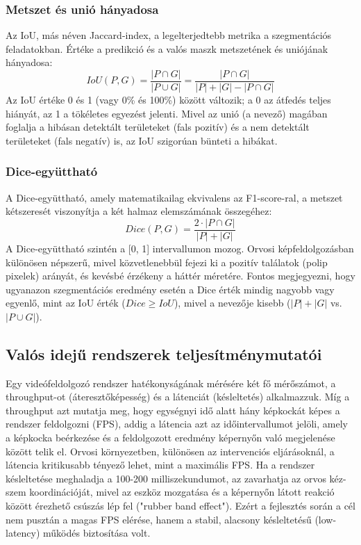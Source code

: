 \documentclass[12pt, a4paper]{report}
\begin{document}
\subsubsection{Metszet és unió hányadosa}
Az IoU, más néven Jaccard-index, a legelterjedtebb metrika a szegmentációs feladatokban. Értéke a predikció és a valós maszk metszetének és uniójának hányadosa:
\begin{equation}
IoU(P, G) = \frac{|P \cap G|}{|P \cup G|} = \frac{|P \cap G|}{|P| + |G| - |P \cap G|}
\end{equation}
Az IoU értéke 0 és 1 (vagy 0\% és 100\%) között változik; a 0 az átfedés teljes hiányát, az 1 a tökéletes egyezést jelenti. Mivel az unió (a nevező) magában foglalja a hibásan detektált területeket (fals pozitív) és a nem detektált területeket (fals negatív) is, az IoU szigorúan bünteti a hibákat.

\subsubsection{Dice-együttható}
A Dice-együttható, amely matematikailag ekvivalens az F1-score-ral, a metszet kétszeresét viszonyítja a két halmaz elemszámának összegéhez:
\begin{equation}
Dice(P, G) = \frac{2 \cdot |P \cap G|}{|P| + |G|}
\end{equation}
A Dice-együttható szintén a [0, 1] intervallumon mozog. Orvosi képfeldolgozásban különösen népszerű, mivel közvetlenebbül fejezi ki a pozitív találatok (polip pixelek) arányát, és kevésbé érzékeny a háttér méretére. Fontos megjegyezni, hogy ugyanazon szegmentációs eredmény esetén a Dice érték mindig nagyobb vagy egyenlő, mint az IoU érték ($Dice \ge IoU$), mivel a nevezője kisebb ($|P|+|G|$ vs. $|P \cup G|$).

\subsection{Valós idejű rendszerek teljesítménymutatói}
Egy videófeldolgozó rendszer hatékonyságának mérésére két fő mérőszámot, a throughput-ot (áteresztőképesség) és a látenciát (késleltetés) alkalmazzuk. Míg a throughput azt mutatja meg, hogy egységnyi idő alatt hány képkockát képes a rendszer feldolgozni (FPS), addig a látencia azt az időintervallumot jelöli, amely a képkocka beérkezése és a feldolgozott eredmény képernyőn való megjelenése között telik el. Orvosi környezetben, különösen az intervenciós eljárásoknál, a látencia kritikusabb tényező lehet, mint a maximális FPS. Ha a rendszer késleltetése meghaladja a 100-200 milliszekundumot, az zavarhatja az orvos kéz-szem koordinációját, mivel az eszköz mozgatása és a képernyőn látott reakció között érezhető csúszás lép fel ("rubber band effect"). Ezért a fejlesztés során a cél nem pusztán a magas FPS elérése, hanem a stabil, alacsony késleltetésű (low-latency) működés biztosítása volt.
\end{document}
